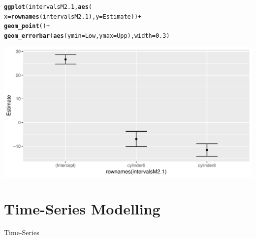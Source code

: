 \documentclass[12pt]{beamer}\usepackage[]{graphicx}\usepackage[]{color}
\makeatletter
\newcommand{\hlnum}[1]{\textcolor[rgb]{0.686,0.059,0.569}{#1}}%
\newcommand{\hlopt}[1]{\textcolor[rgb]{0,0,0}{#1}}%
\newcommand{\hlstd}[1]{\textcolor[rgb]{0.345,0.345,0.345}{#1}}%
\newcommand{\hlkwc}[1]{\textcolor[rgb]{0.333,0.667,0.333}{#1}}%
\newcommand{\hlkwd}[1]{\textcolor[rgb]{0.737,0.353,0.396}{\textbf{#1}}}%
\newenvironment{kframe}{%
 \def\at@end@of@kframe{}%
 \ifinner\ifhmode%
  \def\at@end@of@kframe{\end{minipage}}%
  \begin{minipage}{\columnwidth}%
 \fi\fi%
 \def\FrameCommand##1{\hskip\@totalleftmargin \hskip-\fboxsep
 \colorbox{shadecolor}{##1}\hskip-\fboxsep
     \hskip-\linewidth \hskip-\@totalleftmargin \hskip\columnwidth}%
 \MakeFramed {\advance\hsize-\width
   \@totalleftmargin\z@ \linewidth\hsize
   \@setminipage}}%
 {\par\unskip\endMakeFramed%
 \at@end@of@kframe}
\newenvironment{knitrout}{}{} %
\makeatother
\begin{document}

\begin{frame}[fragile]
\frametitle{}

\begin{knitrout}
\color{fgcolor}\begin{kframe}
\begin{alltt}
\hlkwd{ggplot}\hlstd{(intervalsM2.1,} \hlkwd{aes}\hlstd{(}
   \hlkwc{x}\hlstd{=}\hlkwd{rownames}\hlstd{(intervalsM2.1),} \hlkwc{y}\hlstd{=Estimate) )} \hlopt{+}
  \hlkwd{geom_point}\hlstd{()} \hlopt{+}
  \hlkwd{geom_errorbar}\hlstd{(}\hlkwd{aes}\hlstd{(}\hlkwc{ymin}\hlstd{=Low,} \hlkwc{ymax}\hlstd{=Upp),} \hlkwc{width}\hlstd{=}\hlnum{0.3}\hlstd{)}
\end{alltt}
\end{kframe}

{\centering \includegraphics[width=1\textwidth]{figure/unnamed-chunk-39-1} 

}



\end{knitrout}

\end{frame}

\section{Time-Series Modelling}

\begin{frame}\Huge\centering
Time-Series 
\end{frame}

\end{document}
